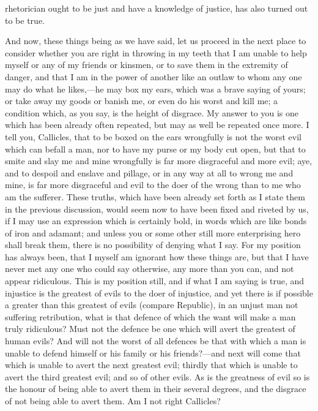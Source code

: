 \documentclass[11pt,letter]{article}
\begin{document}
rhetorician ought to be just and have a knowledge of justice, has also turned out to be true.

\par  And now, these things being as we have said, let us proceed in the next place to consider whether you are right in throwing in my teeth that I am unable to help myself or any of my friends or kinsmen, or to save them in the extremity of danger, and that I am in the power of another like an outlaw to whom any one may do what he likes,—he may box my ears, which was a brave saying of yours; or take away my goods or banish me, or even do his worst and kill me; a condition which, as you say, is the height of disgrace. My answer to you is one which has been already often repeated, but may as well be repeated once more. I tell you, Callicles, that to be boxed on the ears wrongfully is not the worst evil which can befall a man, nor to have my purse or my body cut open, but that to smite and slay me and mine wrongfully is far more disgraceful and more evil; aye, and to despoil and enslave and pillage, or in any way at all to wrong me and mine, is far more disgraceful and evil to the doer of the wrong than to me who am the sufferer. These truths, which have been already set forth as I state them in the previous discussion, would seem now to have been fixed and riveted by us, if I may use an expression which is certainly bold, in words which are like bonds of iron and adamant; and unless you or some other still more enterprising hero shall break them, there is no possibility of denying what I say. For my position has always been, that I myself am ignorant how these things are, but that I have never met any one who could say otherwise, any more than you can, and not appear ridiculous. This is my position still, and if what I am saying is true, and injustice is the greatest of evils to the doer of injustice, and yet there is if possible a greater than this greatest of evils (compare Republic), in an unjust man not suffering retribution, what is that defence of which the want will make a man truly ridiculous? Must not the defence be one which will avert the greatest of human evils? And will not the worst of all defences be that with which a man is unable to defend himself or his family or his friends?—and next will come that which is unable to avert the next greatest evil; thirdly that which is unable to avert the third greatest evil; and so of other evils. As is the greatness of evil so is the honour of being able to avert them in their several degrees, and the disgrace of not being able to avert them. Am I not right Callicles?
\end{document}
